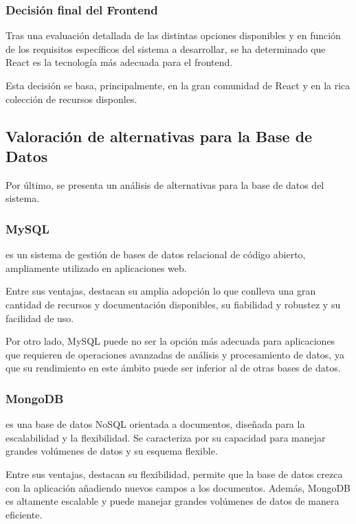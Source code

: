 \subsubsection{Decisión final del Frontend}
Tras una evaluación detallada de las distintas opciones disponibles y en función de los requisitos específicos del sistema a desarrollar, se ha determinado que React es la tecnología más adecuada para el frontend.

Esta decisión se basa, principalmente, en la gran comunidad de React y en la rica colección de recursos disponles.

\subsection{Valoración de alternativas para la Base de Datos}
Por último, se presenta un análisis de alternativas para la base de datos del sistema.

\subsubsection{MySQL}
 es un sistema de gestión de bases de datos relacional de código abierto, ampliamente utilizado en aplicaciones web. 

Entre sus ventajas, destacan su amplia adopción lo que conlleva una gran cantidad de recursos y documentación disponibles, su fiabilidad y robustez y su facilidad de uso. 

Por otro lado, MySQL puede no ser la opción más adecuada para aplicaciones que requieren de operaciones avanzadas de análisis y procesamiento de datos, ya que su rendimiento en este ámbito puede ser inferior al de otras bases de datos.

\subsubsection{MongoDB}
 es una base de datos NoSQL orientada a documentos, diseñada para la escalabilidad y la flexibilidad. Se caracteriza por su capacidad para manejar grandes volúmenes de datos y su esquema flexible.

Entre sus ventajas, destacan su flexibilidad, permite que la base de datos crezca con la aplicación añadiendo nuevos campos a los documentos.
Además, MongoDB es altamente escalable y puede manejar grandes volúmenes de datos de manera eficiente.

